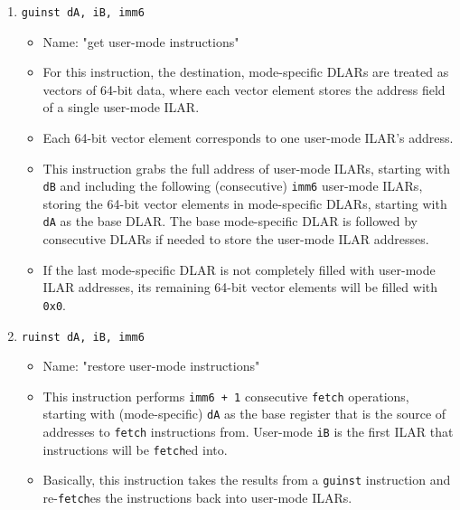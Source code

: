 \documentclass{article}
\begin{document}
\begin{itemize}
\begin{enumerate}
			\item \texttt{guinst dA, iB, imm6}
				\begin{itemize}
				\item Name:  "get user-mode instructions"
				\item For this instruction, the destination, mode-specific
					DLARs are treated as vectors of 64-bit data, where each
					vector element stores the address field of a single
					user-mode ILAR.
				\item Each 64-bit vector element corresponds to one
					user-mode ILAR's address.
				\item This instruction grabs the full address of user-mode
					ILARs, starting with \texttt{dB} and including the
					following (consecutive) \texttt{imm6} user-mode ILARs,
					storing the 64-bit vector elements in mode-specific
					DLARs, starting with \texttt{dA} as the base DLAR.  The
					base mode-specific DLAR is followed by consecutive
					DLARs if needed to store the user-mode ILAR addresses.
				\item If the last mode-specific DLAR is not completely
					filled with user-mode ILAR addresses, its remaining
					64-bit vector elements will be filled with
					\texttt{0x0}.
				\end{itemize}
			\item \texttt{ruinst dA, iB, imm6}
				\begin{itemize}
				\item Name:  "restore user-mode instructions"
				\item This instruction performs \texttt{imm6 + 1}
					consecutive \texttt{fetch} operations, starting with
					(mode-specific) \texttt{dA} as the base register that
					is the source of addresses to \texttt{fetch}
					instructions from.  User-mode \texttt{iB} is the first
					ILAR that instructions will be \texttt{fetch}ed into.
				\item Basically, this instruction takes the results from
					a \texttt{guinst} instruction and re-\texttt{fetch}es
					the instructions back into user-mode ILARs.
				\end{itemize}


\end{enumerate}
\end{itemize}
\end{document}
